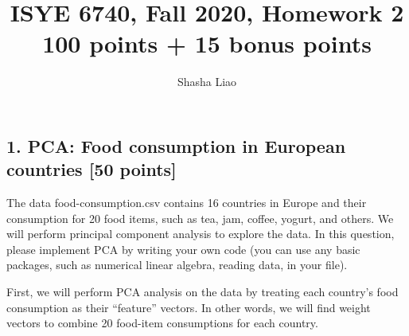 \documentclass[twoside,12pt]{article}
\begin{document}
\title{ISYE 6740, Fall 2020, Homework 2\\ {\small 100 points + 15 bonus points}}
\author{Shasha Liao}
\date{}
\maketitle

\subsection*{1. PCA: Food consumption in European countries [50 points]}

The data \textsf{food-consumption.csv} contains 16 countries in Europe and their consumption for 20 food items, such as tea, jam, coffee, yogurt, and others. We will perform principal component analysis to explore the data. In this question, please implement PCA by writing your own code (you can use any basic packages, such as numerical linear algebra, reading data, in your file).


\vspace{.1in}
First, we will perform PCA analysis on the data by treating each country's food consumption as their ``feature'' vectors. In other words, we will find weight vectors to combine 20 food-item consumptions for each country.  
 
\end{document}
